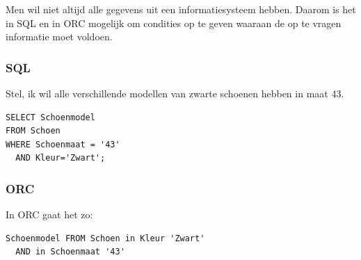 \documentclass{article}
\begin{document}
Men wil niet altijd alle gegevens uit een informatiesysteem hebben. Daarom is
het in SQL en in ORC mogelijk om condities op te geven waaraan de op te vragen
informatie moet voldoen.

\subsubsection{SQL}

Stel, ik wil alle verschillende modellen van zwarte schoenen hebben in maat 43.

\begin{verbatim}
SELECT Schoenmodel 
FROM Schoen 
WHERE Schoenmaat = '43' 
  AND Kleur='Zwart';
\end{verbatim}

\subsubsection{ORC}

In ORC gaat het zo: 

\begin{verbatim}
Schoenmodel FROM Schoen in Kleur 'Zwart' 
  AND in Schoenmaat '43'
\end{verbatim}
\end{document}
